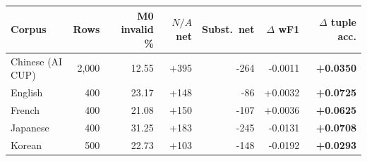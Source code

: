 \begin{tabular}{lrrrrrr}
\toprule
Corpus & Rows & M0 invalid \% & $N\!/\!A$ net & Subst.\ net & $\Delta$ wF1 & $\Delta$ tuple acc. \\
\midrule
Chinese (AI CUP) & 2,000 & 12.55 & +395 & -264 & -0.0011 & \textbf{+0.0350} \\
English & 400 & 23.17 & +148 & -86 & +0.0032 & \textbf{+0.0725} \\
French & 400 & 21.08 & +150 & -107 & +0.0036 & \textbf{+0.0625} \\
Japanese & 400 & 31.25 & +183 & -245 & -0.0131 & \textbf{+0.0708} \\
Korean & 500 & 22.73 & +103 & -148 & -0.0192 & \textbf{+0.0293} \\
\bottomrule
\end{tabular}
